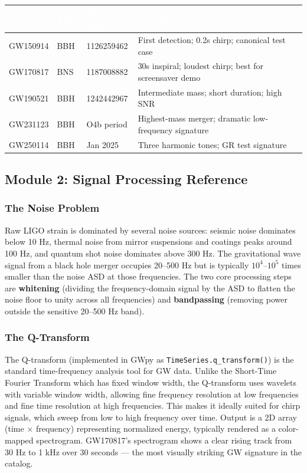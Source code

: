 \documentclass[11pt,letterpaper]{article}
\newcommand{\tableheader}[1]{\textbf{\sffamily\textcolor{white}{#1}}}
\begin{document}
\begin{center}
\begin{tabularx}{\textwidth}{L{2.5cm}L{2cm}L{3cm}X}
\toprule
{}
\tableheader{Event} & \tableheader{Type} & \tableheader{GPS Time} & \tableheader{Visualization Notes} \\
\midrule
GW150914 & BBH & 1126259462 & First detection; 0.2s chirp; canonical test case \\
GW170817 & BNS & 1187008882 & 30s inspiral; loudest chirp; best for screensaver demo \\
GW190521 & BBH & 1242442967 & Intermediate mass; short duration; high SNR \\
GW231123 & BBH & O4b period & Highest-mass merger; dramatic low-frequency signature \\
GW250114 & BBH & Jan 2025 & Three harmonic tones; GR test signature \\
\bottomrule
\end{tabularx}
\end{center}

\subsection{Module 2: Signal Processing Reference}

\subsubsection{The Noise Problem}

Raw LIGO strain is dominated by several noise sources: seismic noise dominates below 10 Hz, thermal noise from mirror suspensions and coatings peaks around 100 Hz, and quantum shot noise dominates above 300 Hz. The gravitational wave signal from a black hole merger occupies 20--500 Hz but is typically $10^4$--$10^5$ times smaller than the noise ASD at those frequencies. The two core processing steps are \textbf{whitening} (dividing the frequency-domain signal by the ASD to flatten the noise floor to unity across all frequencies) and \textbf{bandpassing} (removing power outside the sensitive 20--500 Hz band).

\subsubsection{The Q-Transform}

The Q-transform (implemented in GWpy as \texttt{TimeSeries.q\_transform()}) is the standard time-frequency analysis tool for GW data. Unlike the Short-Time Fourier Transform which has fixed window width, the Q-transform uses wavelets with variable window width, allowing fine frequency resolution at low frequencies and fine time resolution at high frequencies. This makes it ideally suited for chirp signals, which sweep from low to high frequency over time. Output is a 2D array (time $\times$ frequency) representing normalized energy, typically rendered as a color-mapped spectrogram. GW170817's spectrogram shows a clear rising track from 30 Hz to 1 kHz over 30 seconds --- the most visually striking GW signature in the catalog.
\end{document}

